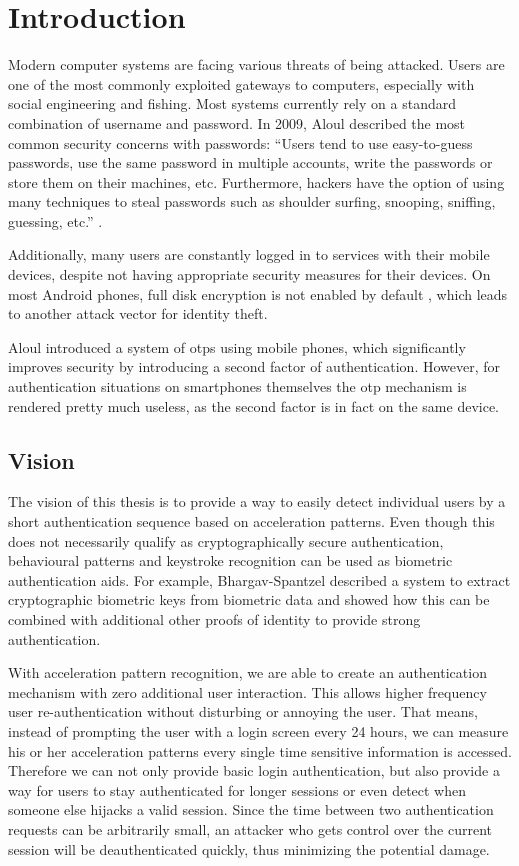 \chapter{Introduction}\label{chapter:introduction}
Modern computer systems are facing various threats of being attacked. Users are one of the most commonly exploited gateways to computers, especially with social engineering and fishing. Most systems currently rely on a standard combination of username and password. In 2009, Aloul \etal described the most common security concerns with passwords:
``Users tend to use easy-to-guess passwords, use the same password in multiple accounts, write the passwords or store them on their machines, etc. Furthermore, hackers have the option of using many techniques to steal passwords such as shoulder surfing, snooping, sniffing, guessing, etc.'' \cite{aloul2009two} .

Additionally, many users are constantly logged in to services with their mobile devices, despite not having appropriate security measures for their devices. On most Android phones, full disk encryption is not enabled by default \cite{manhattan2015encryption}, which leads to another attack vector for identity theft.

Aloul \etal introduced a system of \glspl{otp} using mobile phones, which significantly improves security by introducing a second factor of authentication. However, for authentication situations on smartphones themselves the \gls{otp} mechanism is rendered pretty much useless, as the second factor is in fact on the same device.

\section{Vision}
The vision of this thesis is to provide a way to easily detect individual users by a short authentication sequence based on acceleration patterns. Even though this does not necessarily qualify as cryptographically secure authentication, behavioural patterns and keystroke recognition can be used as biometric authentication aids. For example, Bhargav-Spantzel \etal \cite{bhargav2006privacy} described a system to extract cryptographic biometric keys from biometric data and showed how this can be combined with additional other proofs of identity to provide strong authentication.

With acceleration pattern recognition, we are able to create an authentication mechanism with zero additional user interaction. This allows higher frequency user re-authentication without disturbing or annoying the user. That means, instead of prompting the user with a login screen every 24 hours, we can measure his or her acceleration patterns every single time sensitive information is accessed. Therefore we can not only provide basic login authentication, but also provide a way for users to stay authenticated for longer sessions or even detect when someone else hijacks a valid session. Since the time between two authentication requests can be arbitrarily small, an attacker who gets control over the current session will be deauthenticated quickly, thus minimizing the potential damage.
